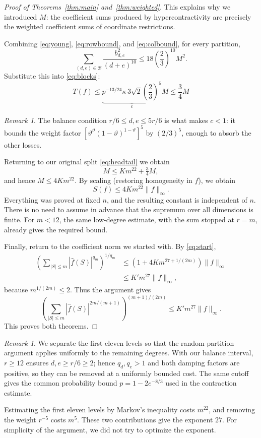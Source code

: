 \documentclass[11pt]{amsart}
\theoremstyle{remark}
\newtheorem{remark}[theorem]{Remark}
\numberwithin{equation}{section}
\newcommand{\bal}{\mathcal B}
\begin{document}
\begin{proof}[Proof of Theorems~\ref{thm:main} and~\ref{thm:weighted}]
This explains why we introduced $M$: the coefficient sums produced
by hypercontractivity are precisely the weighted coefficient sums of
coordinate restrictions.



Combining \eqref{eq:young}, \eqref{eq:rowbound}, and \eqref{eq:colbound}, for
every partition,
\[
\sum_{(d,e)\in\bal}\frac{b_{d,e}^2}{(d+e)^{10}}
\le18\left(\frac23\right)^{10}M^2.
\]
Substitute this into \eqref{eq:blocks}:
\begin{equation}
T(f)\le
\underbrace{p^{-13/24}\kappa\,3\sqrt2\left(\frac23\right)^5}_{c}M \leq \frac{3}{4}M
\label{eq:tail}
\end{equation}

\begin{remark}
The balance condition $r/6 \leq d,e \leq 5r/6$ is what makes $c<1$: it bounds the weight factor
$[\vartheta^\vartheta(1-\vartheta)^{1-\vartheta}]^5$ by $(2/3)^5$,
enough to absorb the other losses. 
\end{remark}


Returning to our original split \eqref{eq:headtail}  we obtain
\[
M\le Km^{22}+\tfrac34M,
\]
and hence $M\le4Km^{22}$. By scaling (restoring homogeneity in $f$), we obtain
\begin{equation}
S(f)\le4Km^{22}\|f\|_\infty.
\label{eq:weighted}
\end{equation}
Everything was proved at fixed $n$, and the resulting constant is independent
of $n$. There is no need to assume in advance that the supremum over all
dimensions is finite. For $m<12$, the same low-degree estimate, with the sum
stopped at $r=m$, already gives the required bound.

Finally, return to the coefficient norm we started with. By \eqref{eq:start},
\begin{align*}
\left(\sum_{|S|\le m}|\widehat f(S)|^{q_m}\right)^{1/q_m}
&\le\left(1+4Km^{27+1/(2m)}\right)\|f\|_\infty\\
&\le K'm^{27}\|f\|_\infty,
\end{align*}
because $m^{1/(2m)}\le2$. Thus the argument gives
\[
\left(\sum_{|S|\le m}|\widehat f(S)|^{2m/(m+1)}\right)^{(m+1)/(2m)}
\le K'm^{27}\|f\|_\infty.
\]
This proves both theorems.
\end{proof}

\begin{remark}
We separate the first eleven levels so that the random-partition argument
applies uniformly to the remaining degrees. With our balance interval,
$r\ge12$ ensures $d,e\ge r/6\ge2$; hence $q_d,q_e>1$ and both damping
factors are positive, so they can be removed at a uniformly bounded cost.
The same cutoff gives the common probability bound $p=1-2e^{-8/3}$ used
in the contraction estimate.

Estimating the first eleven levels by Markov's inequality costs $m^{22}$,
and removing the weight $r^{-5}$ costs $m^5$. These two contributions give
the exponent $27$. For simplicity of the argument, we did not try to
optimize the exponent.
\end{remark}
\end{document}
